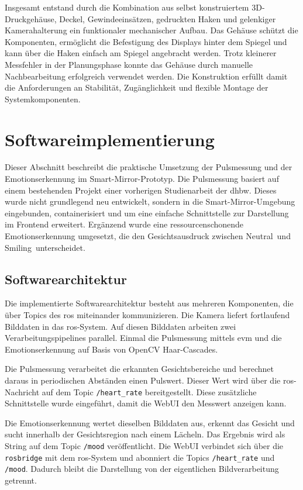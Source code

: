 Insgesamt entstand durch die Kombination aus selbst konstruiertem 3D-Druckgehäuse, Deckel, Gewindeeinsätzen, gedruckten Haken und gelenkiger Kamerahalterung ein funktionaler mechanischer Aufbau. Das Gehäuse schützt die Komponenten, ermöglicht die Befestigung des Displays hinter dem Spiegel und kann über die Haken einfach am Spiegel angebracht werden. Trotz kleinerer Messfehler in der Planungsphase konnte das Gehäuse durch manuelle Nachbearbeitung erfolgreich verwendet werden. Die Konstruktion erfüllt damit die Anforderungen an Stabilität, Zugänglichkeit und flexible Montage der Systemkomponenten.

\section{Softwareimplementierung}

Dieser Abschnitt beschreibt die praktische Umsetzung der Pulsmessung und der Emotionserkennung im Smart-Mirror-Prototyp. Die Pulsmessung basiert auf einem bestehenden Projekt einer vorherigen Studienarbeit der \ac{dhbw}. Dieses wurde nicht grundlegend neu entwickelt, sondern in die Smart-Mirror-Umgebung eingebunden, containerisiert und um eine einfache Schnittstelle zur Darstellung im Frontend erweitert. Ergänzend wurde eine ressourcenschonende Emotionserkennung umgesetzt, die den Gesichtsausdruck zwischen \glqq Neutral\grqq\ und \glqq Smiling\grqq\ unterscheidet.

\subsection{Softwarearchitektur}

Die implementierte Softwarearchitektur besteht aus mehreren Komponenten, die über Topics des \ac{ros} miteinander kommunizieren. Die Kamera liefert fortlaufend Bilddaten in das \ac{ros}-System. Auf diesen Bilddaten arbeiten zwei Verarbeitungspipelines parallel. Einmal die Pulsmessung mittels \ac{evm} und die Emotionserkennung auf Basis von OpenCV Haar-Cascades.

Die Pulsmessung verarbeitet die erkannten Gesichtsbereiche und berechnet daraus in periodischen Abständen einen Pulswert. Dieser Wert wird über die \ac{ros}-Nachricht auf dem Topic \texttt{/heart\_rate} bereitgestellt. Diese zusätzliche Schnittstelle wurde eingeführt, damit die WebUI den Messwert anzeigen kann.

Die Emotionserkennung wertet dieselben Bilddaten aus, erkennt das Gesicht und sucht innerhalb der Gesichtsregion nach einem Lächeln. Das Ergebnis wird als String auf dem Topic \texttt{/mood} veröffentlicht. Die WebUI verbindet sich über die \texttt{rosbridge} mit dem \ac{ros}-System und abonniert die Topics \texttt{/heart\_rate} und \texttt{/mood}. Dadurch bleibt die Darstellung von der eigentlichen Bildverarbeitung getrennt.

